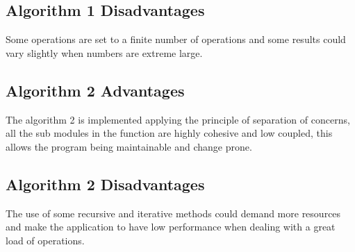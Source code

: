 \documentclass[12pt]{article}
\begin{document}
\subsection{Algorithm 1 Disadvantages}
Some operations are set to a finite number of operations and some results could vary slightly when numbers are extreme large.  
\subsection{Algorithm 2 Advantages}
The algorithm 2 is implemented applying the principle of separation of concerns, all the sub modules in the function are highly cohesive and low coupled, this allows the program being maintainable and change prone.
\subsection{Algorithm 2 Disadvantages}
The use of some recursive and iterative methods could demand more resources and make the application to have low performance when dealing with a great load of operations. 
\end{document}
